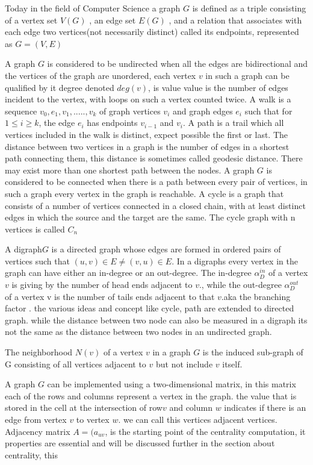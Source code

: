 Today in the field of Computer Science a graph ${G}$ is defined as a triple consisting of a vertex set ${V(G)}$ , an edge set ${E(G)}$ , and a relation that associates with each edge two vertices(not necessarily distinct) called its endpoints, represented as ${G = (V, E)}$ \cite{westIntroduction}

A graph ${G}$ is considered to be undirected when all the edges are bidirectional and the vertices of the graph are unordered, each vertex ${v}$ in such a graph can be qualified by it degree denoted ${deg(v)}$, is value value is the number of edges incident to the vertex, with loops on such a vertex counted twice.  A walk is a sequence ${v_0, e_1, v_1, ....., v_k}$ of graph vertices ${v_i}$ and graph edges ${e_i}$ such that for ${1 \leq i \geq k}$, the edge ${e_i}$ has endpoints ${v_{i-1}}$ and ${v_i}$\cite{westIntroduction}. A path is a trail which all vertices  included in the walk is distinct, expect possible the first or last.  The distance between two vertices in a graph is the number of edges in a shortest path connecting them,  this distance is sometimes called geodesic distance. There may exist more than one shortest path between the nodes. A graph ${G}$ is considered to be connected  when there is a path between every pair of vertices, in such a graph every vertex in the graph is reachable. A cycle is a graph that consists of a number of vertices connected in a closed chain, with at least distinct edges in which the source and the target are the same.  The cycle graph with n vertices is called ${C_n}$

A digraph${G}$ is a directed graph whose edges are formed in ordered pairs of vertices such that ${(u, v) \in E \neq (v, u)  \in E}$. In a digraphs every vertex in the graph can have either an in-degree or an out-degree. The in-degree ${\alpha^{in }_D}$ of a vertex ${v}$ is giving by the number of head ends adjacent to ${v}$., while the out-degree  
${\alpha^{out }_D}$ of a vertex v is the number of tails ends adjacent to that ${v}$.aka the branching factor . the various ideas and concept like cycle, path are extended to directed graph.  while the distance between two node can also be measured in a digraph its not the same as the distance between two nodes in an undirected graph. 

The neighborhood ${N(v)}$ of a vertex ${v}$ in a graph ${G}$ is the induced sub-graph of G consisting of all vertices adjacent to  ${v}$ but not include ${v}$ itself. 

A graph ${G}$ can be implemented using a two-dimensional matrix, in this matrix each of the rows and columns represent a vertex in the graph. the value that is stored in the cell at the intersection of row${v}$ and column ${w}$ indicates if there is an edge from vertex ${v}$ to vertex ${w}$. we can call this vertices adjacent vertices. 
Adjacency matrix ${A = (a_{uv}}$, is the starting point of the centrality computation, it properties are essential  and will be discussed further in the section about centrality, this 

